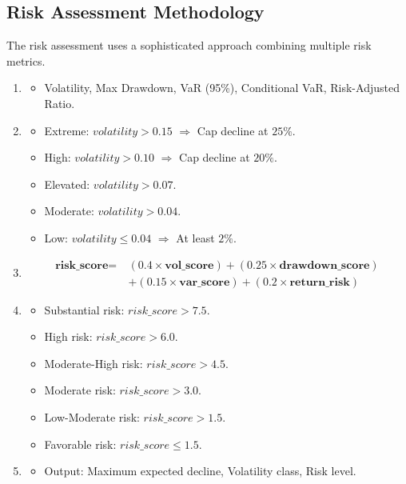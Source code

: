 \documentclass[3p,times,procedia]{elsarticle}
\begin{document}
\subsection{Risk Assessment Methodology}
The risk assessment uses a sophisticated approach combining multiple risk metrics.
\begin{enumerate}
    \item {}
    \begin{itemize}
        \item Volatility, Max Drawdown, VaR (95\%), Conditional VaR, Risk-Adjusted Ratio.
    \end{itemize}

    \item {}
    \begin{itemize}
        \item Extreme: $volatility > 0.15$  $\Rightarrow$ Cap decline at $25\%$.
        \item High: $volatility > 0.10$  $\Rightarrow$ Cap decline at $20\%$.
        \item Elevated: $volatility > 0.07$.
        \item Moderate: $volatility > 0.04$.
        \item Low: $volatility \leq 0.04$ $\Rightarrow$ At least $2\%$.
    \end{itemize}

    \item {}
\begin{align}
\textbf{risk\_score} =\ & (0.4 \times \textbf{vol\_score}) + (0.25 \times \textbf{drawdown\_score}) \nonumber \\
& + (0.15 \times \textbf{var\_score}) + (0.2 \times \textbf{return\_risk})
\end{align}

    \item {}
    \begin{itemize}
        \item Substantial risk: $risk\_score > 7.5$.
        \item High risk: $risk\_score > 6.0$.
        \item Moderate-High risk: $risk\_score > 4.5$.
        \item Moderate risk: $risk\_score > 3.0$.
        \item Low-Moderate risk: $risk\_score > 1.5$.
        \item Favorable risk: $risk\_score \leq 1.5$.
    \end{itemize}

    \item {}
    \begin{itemize}
        \item Output: Maximum expected decline, Volatility class, Risk level.
    \end{itemize}

\end{enumerate}
\end{document}
